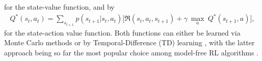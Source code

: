 for the state-value function, and by
\begin{multline}
    Q^{*}(s_t,a_t)=\sum_{s_{t+1}}p(s_{t+1} | s_{t}, a_{t})  \bigg[\Re (s_{t}, a_{t}, s_{t+1}) + \gamma \: \underset{a}{\max} \: Q^{*}(s_{t+1}, a) \bigg],
\end{multline}
for the state-action value function. Both functions can either be learned via Monte Carlo methods or by Temporal-Difference (TD) learning \cite{sutton1988learning}, with the latter approach being so far the most popular choice among model-free RL algorithms \cite{watkins1992q, rummery1994line, hasselt2010double}. %

